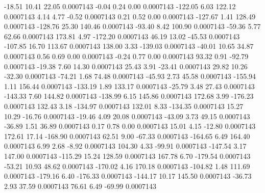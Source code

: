       -18.51       10.41       22.05     0.0007143
       -0.04        0.24        0.00     0.0007143
     -122.05        6.03      122.12     0.0007143
        4.14        4.77       -0.52     0.0007143
        0.21        0.52        0.00     0.0007143
     -127.67        1.41      128.49     0.0007143
     -128.76       25.30      140.46     0.0007143
      -93.40        8.42      100.90     0.0007143
      -59.36        5.77       62.66     0.0007143
      173.81        4.97     -172.20     0.0007143
       46.19       13.02      -45.53     0.0007143
     -107.85       16.70      113.67     0.0007143
      138.00        3.33     -139.03     0.0007143
      -40.01       10.65       34.87     0.0007143
        0.56        0.69        0.00     0.0007143
       -0.24        0.77        0.00     0.0007143
       93.32        0.91      -92.79     0.0007143
      -19.38        7.60       14.30     0.0007143
       25.43        3.91      -23.41     0.0007143
       29.82       10.26      -32.30     0.0007143
      -74.21        1.68       74.48     0.0007143
      -45.93        2.73       45.58     0.0007143
     -155.94        1.11      156.44     0.0007143
     -133.19        1.89      133.17     0.0007143
      -25.79        3.48       27.43     0.0007143
     -143.33        7.60      144.82     0.0007143
     -138.99        6.15      145.86     0.0007143
      172.68        3.99     -176.23     0.0007143
      132.43        3.18     -134.97     0.0007143
      132.01        8.33     -134.35     0.0007143
       15.27       10.29      -16.76     0.0007143
      -19.46        4.09       20.08     0.0007143
      -43.09        3.73       49.15     0.0007143
      -36.89        1.51       36.89     0.0007143
        0.17        0.78        0.00     0.0007143
       15.01        4.15      -12.80     0.0007143
      172.61       17.14     -168.90     0.0007143
       62.51        9.00      -67.33     0.0007143
     -164.65        6.49      164.40     0.0007143
        6.99        2.68       -8.92     0.0007143
      104.30        4.33      -99.91     0.0007143
     -147.54        3.17      147.00     0.0007143
     -115.29       15.24      128.59     0.0007143
      167.78        6.70     -179.54     0.0007143
      -53.21       10.93       48.62     0.0007143
     -170.02        4.16      170.18     0.0007143
     -104.82        1.48      111.69     0.0007143
     -179.16        6.40     -176.33     0.0007143
     -144.17       10.17      145.50     0.0007143
      -36.73        2.93       37.59     0.0007143
       76.61        6.49      -69.99     0.0007143
